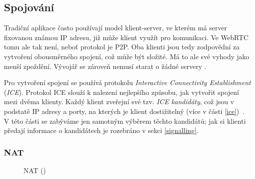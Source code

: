 \subsection{Spojování}\label{connecting}

Tradiční aplikace často používají model klient-server, ve kterém má server
fixovanou známou IP adresu, již může klient využít pro komunikaci. Ve WebRTC
tomu ale tak není, neboť protokol je P2P. Oba klienti jsou tedy zodpovědní za
vytvoření obousměrného spojení, což může být složité. Má to ale své vyhody jako
menší zpoždění. Vývojář se zároveň nemusí starat o žádné servery
\parencite{WebRTCForTheCurious}.

Pro vytvoření spojení se používá protokolu \textit{Interactive Connectivity
    Establishment} (\textit{ICE}). Protokol ICE slouží k nalezení nejlepšího
způsobu, jak vytvořit spojení mezi dvěma klienty. Každý klient zveřejní své tzv.
\textit{ICE kandidáty}, což jsou v podstatě IP adresy a porty, na kterých je
klient dostižitelný (více v části \ref{ice})~\parencite{WebRTCForTheCurious}. V této
části se zabýváme jen samotným výběrem těchto kandidátů; jak si klienti předají
informace o kandidátech je rozebráno v sekci \ref{signalling}.

\subsubsection{NAT}\label{nat}

\begin{figure}[H]
    \centering
    \caption{NAT (\publicPrivateIP)}
    \label{natFig}
\end{figure}

